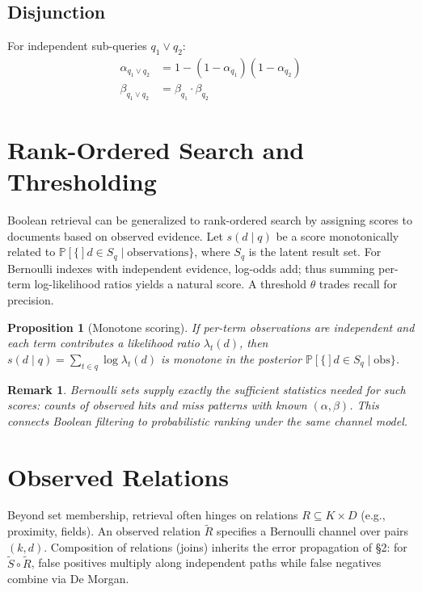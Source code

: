 \documentclass[11pt,final,hidelinks]{article}
\newtheorem{proposition}[theorem]{Proposition}
\newtheorem{remark}[theorem]{Remark}
\newcommand{\obs}[1]{\widetilde{#1}}  %
\newcommand{\Prob}[1]{\mathbb{P}\left[#1\right]}
\newcommand{\fprate}{\alpha}
\newcommand{\fnrate}{\beta}
\begin{document}
\subsection{Disjunction}

For independent sub-queries $q_1 \lor q_2$:
\begin{align}
\fprate_{q_1 \lor q_2} &= 1 - (1 - \fprate_{q_1})(1 - \fprate_{q_2}) \\
\fnrate_{q_1 \lor q_2} &= \fnrate_{q_1} \cdot \fnrate_{q_2}
\end{align}

\section{Rank-Ordered Search and Thresholding}

Boolean retrieval can be generalized to rank-ordered search by assigning scores to documents based on observed evidence. Let $s(d\mid q)$ be a score monotonically related to $\Prob\{d\in S_q \mid \text{observations}\}$, where $S_q$ is the latent result set. For Bernoulli indexes with independent evidence, log-odds add; thus summing per-term log-likelihood ratios yields a natural score. A threshold $\theta$ trades recall for precision.

\begin{proposition}[Monotone scoring]
If per-term observations are independent and each term contributes a likelihood ratio $\lambda_t(d)$, then $s(d\mid q)=\sum_{t\in q} \log \lambda_t(d)$ is monotone in the posterior $\Prob\{d\in S_q\mid\text{obs}\}$.
\end{proposition}

\begin{remark}
Bernoulli sets supply exactly the sufficient statistics needed for such scores: counts of observed hits and miss patterns with known $(\fprate,\fnrate)$. This connects Boolean filtering to probabilistic ranking under the same channel model.
\end{remark}

\section{Observed Relations}

Beyond set membership, retrieval often hinges on relations $R\subseteq K\times D$ (e.g., proximity, fields). An observed relation $\obs{R}$ specifies a Bernoulli channel over pairs $(k,d)$. Composition of relations (joins) inherits the error propagation of \S2: for $\obs{S}\circ\obs{R}$, false positives multiply along independent paths while false negatives combine via De Morgan.
\end{document}
